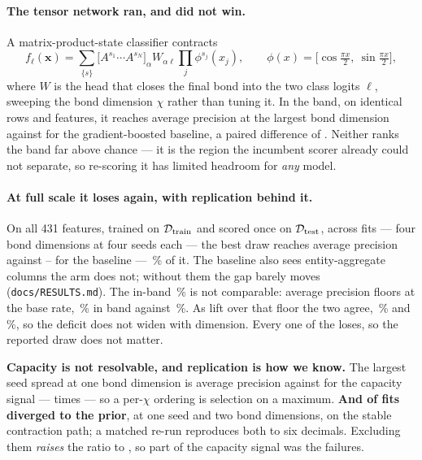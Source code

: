 \paragraph{The tensor network ran, and did not win.} A matrix-product-state classifier contracts
\[
f_\ell(\mathbf{x}) = \sum_{\{s\}} \bigl[A^{s_1} \cdots A^{s_N}\bigr]_\alpha W_{\alpha\ell}
\prod_j \phi^{s_j}(x_j), \qquad \phi(x) = \bigl[\cos\tfrac{\pi x}{2},\ \sin\tfrac{\pi x}{2}\bigr],
\]
where $W$ is the head that closes the final bond into the two class logits $\ell$, sweeping the
bond dimension $\chi$ rather than tuning it. In the band, on identical rows and features, it reaches average
precision \ClaimMpsApBestChi{} at the largest bond dimension against \ClaimGbdtApBand{} for
the gradient-boosted  baseline, a paired difference of \ClaimMpsDeltaApBestChi.
Neither ranks the band far above chance --- it is the region the incumbent scorer already could
not separate, so re-scoring it has limited headroom for \emph{any} model.



\paragraph{At full scale it loses again, with replication behind it.} On all 431
features, trained on $\mathcal{D}_{\mathrm{train}}$ and scored once on $\mathcal{D}_{\mathrm{test}}$, across \ClaimSweepJobs{} fits ---
four bond dimensions at four seeds each --- the best draw reaches \ClaimSweepBestAp{} average
precision against \ClaimGbdtFullApMin--\ClaimGbdtFullApMax{} for the baseline ---
\ClaimMpsShareFull\,\% of it. The baseline also sees entity-aggregate
columns the arm does not; without them the gap barely moves (\texttt{docs/RESULTS.md}). The in-band \ClaimMpsShareBand\,\% is not comparable:
average precision floors at the base rate, \ClaimBandFraudRate\,\% in band against
\ClaimTestFraudRate\,\%. As lift over that floor the two agree, \ClaimMpsLiftShareBand\,\% and
\ClaimMpsLiftShareFull\,\%, so the deficit does not widen with dimension. Every one of the
\ClaimSweepJobs{} loses, so the reported draw does not matter.

\textbf{Capacity is not resolvable, and replication is how we know.} The largest seed spread at one bond
dimension is \ClaimSweepSeedSpread{} average precision against \ClaimSweepChiSpread{} for the
capacity signal --- \ClaimSweepSpreadRatio{} times --- so a per-$\chi$ ordering is selection on
a maximum. \textbf{And \ClaimSweepStalled{} of \ClaimSweepJobs{} fits diverged to the prior},
at one seed and two bond dimensions, on the stable contraction path; a matched re-run
reproduces both to six decimals. Excluding them \emph{raises} the ratio to
\ClaimSweepSpreadRatioTrained{}, so part of the capacity signal was the failures.


